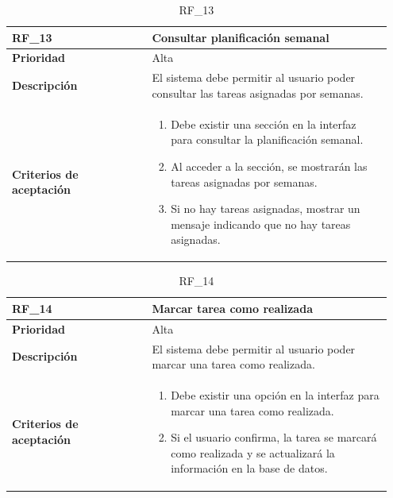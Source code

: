 \begin{table}[htb!]
    \begin{tabular}{|p{0.35\linewidth}|p{0.6\linewidth}|}
        \hline
        \rowcolor[HTML]{C0C0C0}  
        \textbf{RF\_13} & \textbf{Consultar planificación semanal} \\
        \hline
        \textbf{Prioridad} & Alta \\
        \hline
        \textbf{Descripción} & El sistema debe permitir al usuario poder consultar las tareas asignadas por semanas.  \\
        \hline
        \vspace{0.5mm}
        \textbf{Criterios de aceptación} & 
        \begin{minipage}[t]{0.9\linewidth}
            \begin{enumerate}
                \item Debe existir una sección en la interfaz para consultar la planificación semanal.
                \item Al acceder a la sección, se mostrarán las tareas asignadas por semanas.
                \item Si no hay tareas asignadas, mostrar un mensaje indicando que no hay tareas asignadas.
            \end{enumerate}
            \vspace{2mm}
        \end{minipage} \\
        \hline
    \end{tabular}
    \caption{RF\_13}
    \label{req:RF13}
\end{table}

\begin{table}[htb!]
    \begin{tabular}{|p{0.35\linewidth}|p{0.6\linewidth}|}
        \hline
        \rowcolor[HTML]{C0C0C0}  
        \textbf{RF\_14} & \textbf{Marcar tarea como realizada} \\
        \hline
        \textbf{Prioridad} & Alta \\
        \hline
        \textbf{Descripción} & El sistema debe permitir al usuario poder marcar una tarea como realizada.  \\
        \hline
        \vspace{0.5mm}
        \textbf{Criterios de aceptación} & 
        \begin{minipage}[t]{0.9\linewidth}
            \begin{enumerate}
                \item Debe existir una opción en la interfaz para marcar una tarea como realizada.
                \item Si el usuario confirma, la tarea se marcará como realizada y se actualizará la información en la base de datos.
            \end{enumerate}
            \vspace{2mm}
        \end{minipage} \\
        \hline
    \end{tabular}
    \caption{RF\_14}
    \label{req:RF14}
\end{table}

